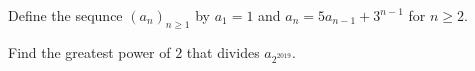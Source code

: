 Define the sequnce  ${(a_n)}_{n\ge1}$ by $a_1=1$ and $a_n=5a_{n-1}+3^{n-1}$ for $n\ge2$.

Find the greatest power of $2$ that divides $a_{2^{2019}}$.
